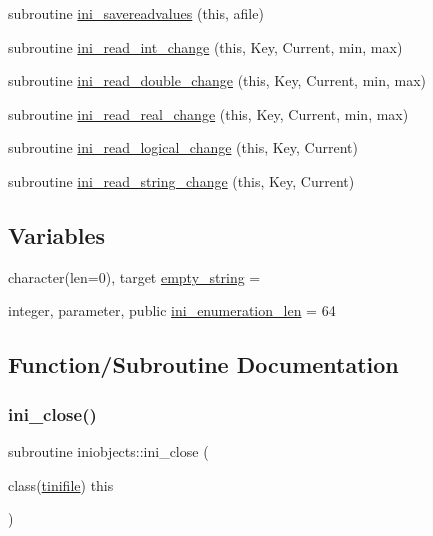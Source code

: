 \begin{DoxyCompactItemize}
\item 
subroutine \mbox{\hyperlink{namespaceiniobjects_a3c4c3ca8183b5dcca8af9d4b19808462}{ini\+\_\+savereadvalues}} (this, afile)
\item 
subroutine \mbox{\hyperlink{namespaceiniobjects_a67f08b5a06f2f74225f692955a712320}{ini\+\_\+read\+\_\+int\+\_\+change}} (this, Key, Current, min, max)
\item 
subroutine \mbox{\hyperlink{namespaceiniobjects_a5e063b545af508f22c652618784a4106}{ini\+\_\+read\+\_\+double\+\_\+change}} (this, Key, Current, min, max)
\item 
subroutine \mbox{\hyperlink{namespaceiniobjects_ab840810b30c65a67b6834782fe064f34}{ini\+\_\+read\+\_\+real\+\_\+change}} (this, Key, Current, min, max)
\item 
subroutine \mbox{\hyperlink{namespaceiniobjects_a21e68c5f321b32ea2f6086c05c89af1a}{ini\+\_\+read\+\_\+logical\+\_\+change}} (this, Key, Current)
\item 
subroutine \mbox{\hyperlink{namespaceiniobjects_a6770561ba1885823e0a1d5d341cb7fa5}{ini\+\_\+read\+\_\+string\+\_\+change}} (this, Key, Current)
\end{DoxyCompactItemize}
\subsection*{Variables}
\begin{DoxyCompactItemize}
\item 
character(len=0), target \mbox{\hyperlink{namespaceiniobjects_a09461a87d61c35db5d0ad8895baae8dd}{empty\+\_\+string}} = \textquotesingle{}\textquotesingle{}
\item 
integer, parameter, public \mbox{\hyperlink{namespaceiniobjects_ad4e84129fd47c679fb1fcdd444d9fc84}{ini\+\_\+enumeration\+\_\+len}} = 64
\end{DoxyCompactItemize}


\subsection{Function/\+Subroutine Documentation}
\mbox{\label{namespaceiniobjects_a54b6f011847c6047fd2e0dfbe9d9314d}} 
\subsubsection{\texorpdfstring{ini\+\_\+close()}{ini\_close()}}
{\footnotesize\ttfamily subroutine iniobjects\+::ini\+\_\+close (\begin{DoxyParamCaption}\item[{class(\mbox{\hyperlink{structiniobjects_1_1tinifile}{tinifile}})}]{this }\end{DoxyParamCaption})\hspace{0.3cm}{\ttfamily [private]}}

